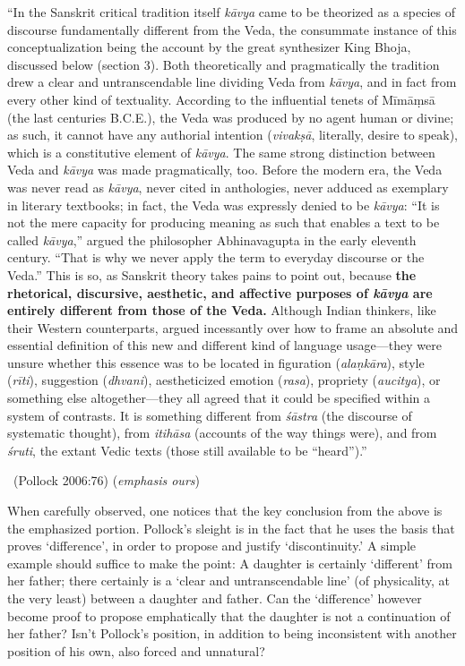 \begin{myquote}
“In the Sanskrit critical tradition itself \textit{kāvya} came to be theorized as a species of discourse fundamentally different from the Veda, the consummate instance of this conceptualization being the account by the great synthesizer King Bhoja, discussed below (section 3). Both theoretically and pragmatically the tradition drew a clear and untranscendable line dividing Veda from \textit{kāvya}, and in fact from every other kind of textuality. According to the influential tenets of Mīmāṃsā (the last centuries B.C.E.), the Veda was produced by no agent human or divine; as such, it cannot have any authorial intention (\textit{vivakṣā}, literally, desire to speak), which is a constitutive element of \textit{kāvya}. The same strong distinction between Veda and \textit{kāvya} was made pragmatically, too. Before the modern era, the Veda was never read as \textit{kāvya}, never cited in anthologies, never adduced as exemplary in literary textbooks; in fact, the Veda was expressly denied to be \textit{kāvya}: “It is not the mere capacity for producing meaning as such that enables a text to be called \textit{kāvya},” argued the philosopher Abhinavagupta in the early eleventh century. “That is why we never apply the term to everyday discourse or the Veda.” This is so, as Sanskrit theory takes pains to point out, because \textbf{the rhetorical, discursive, aesthetic, and affective purposes of \textit{kāvya} are entirely different from those of the Veda.} Although Indian thinkers, like their Western counterparts, argued incessantly over how to frame an absolute and essential definition of this new and different kind of language usage—they were unsure whether this essence was to be located in figuration (\textit{alaṇkāra}), style (\textit{rīti}), suggestion (\textit{dhvani}), aestheticized emotion (\textit{rasa}), propriety (\textit{aucitya}), or something else altogether—they all agreed that it could be specified within a system of contrasts. It is something different from \textit{śāstra} (the discourse of systematic thought), from \textit{itihāsa} (accounts of the way things were), and from \textit{śruti}, the extant Vedic texts (those still available to be “heard”).” 

~\hfill (Pollock 2006:76) (\textit{emphasis ours})
\end{myquote}

When carefully observed, one notices that the key conclusion from the above is the emphasized portion. Pollock’s sleight is in the fact that he uses the basis that proves ‘difference’, in order to propose and justify ‘discontinuity.’ A simple example should suffice to make the point: A daughter is certainly ‘different’ from her father; there certainly is a ‘clear and untranscendable line’ (of physicality, at the very least) between a daughter and father. Can the ‘difference’ however become proof to propose emphatically that the daughter is not a continuation of her father? Isn’t Pollock’s position, in addition to being inconsistent with another position of his own, also forced and unnatural?



